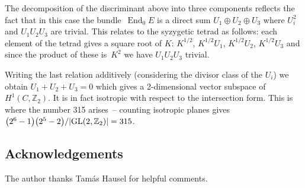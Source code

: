 \documentclass[pdftex]{sigma}
\numberwithin{equation}{section}
\begin{document}
 The decomposition of the discriminant above into three components reflects the fact that in this case the bundle~$\operatorname{End}_0E$ is a direct sum $U_1\oplus U_2\oplus U_3$ where $U_i^2$ and $U_1U_2 U_3$ are trivial. This relates to the syzygetic tetrad as follows: each element of the tetrad gives a square root of $K$: $K^{1/2}$, $K^{1/2}U_1$, $K^{1/2}U_2$, $K^{1/2}U_3$ and since the product of these is~$K^2$ we have $U_1U_2U_3$ trivial.

 Writing the last relation additively (considering the divisor class of the $U_i$) we obtain $U_1+U_2+U_3=0$ which gives a 2-dimensional vector subspace of $H^1(C,{\mathbb Z}_2)$. It is in fact isotropic with respect to the intersection form. This is where
 the number 315 arises~-- counting isotropic planes gives $\big(2^6-1\big)\big(2^5-2\big)/\vert {\rm GL}(2,{\mathbb Z}_2)\vert=315$.

\subsection*{Acknowledgements}
The author thanks Tam\'as Hausel for helpful comments.
\end{document}
